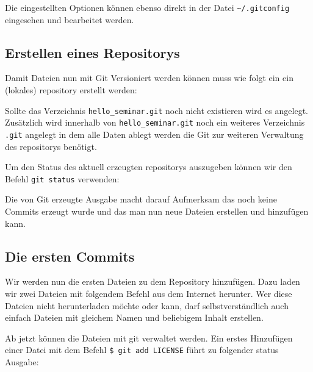 Die eingestellten Optionen können ebenso direkt in der Datei
\texttt{\textasciitilde/.gitconfig} eingesehen und bearbeitet werden.

\subsection{Erstellen eines Repositorys}\label{startup}
Damit Dateien nun mit Git Versioniert werden können muss wie folgt ein ein (lokales)
\gls{repository} erstellt werden:



Sollte das Verzeichnis \texttt{hello\_seminar.git} noch nicht existieren wird es
angelegt. Zusätzlich wird innerhalb von \texttt{hello\_seminar.git} noch ein
weiteres Verzeichnis \texttt{.git} angelegt in dem alle Daten ablegt werden die
Git zur weiteren Verwaltung des \glspl{repository} benötigt.

Um den Status des aktuell erzeugten \glspl{repository} auszugeben können wir
den Befehl \texttt{git status} verwenden:



Die von Git erzeugte Ausgabe macht darauf Aufmerksam das noch keine Commits
erzeugt wurde und das man nun neue Dateien erstellen und hinzufügen kann.

\subsection{Die ersten Commits}\label{first_commits}

Wir werden nun die ersten Dateien zu dem Repository hinzufügen. Dazu laden wir
zwei Dateien mit folgendem Befehl aus dem Internet herunter. Wer diese Dateien
nicht herunterladen möchte oder kann, darf selbstverständlich auch einfach
Dateien mit gleichem Namen und beliebigem Inhalt erstellen.



Ab jetzt können die Dateien mit \gls{git} verwaltet werden. Ein erstes
Hinzufügen einer Datei mit dem Befehl \texttt{\$ git add LICENSE} führt zu
folgender status Ausgabe:



